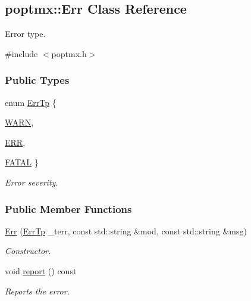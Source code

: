 \hypertarget{classpoptmx_1_1Err}{
\subsection{poptmx::Err Class Reference}
\label{classpoptmx_1_1Err}
}


Error type.  




{\ttfamily \#include $<$poptmx.h$>$}

\subsubsection*{Public Types}
\begin{DoxyCompactItemize}
\item 
enum \hyperlink{classpoptmx_1_1Err_a5536fbfa146a3c996c8d24282451d4aa}{ErrTp} \{ \par
\hyperlink{classpoptmx_1_1Err_a5536fbfa146a3c996c8d24282451d4aaade56e46c65dd44ee6d72a6421940f67d}{WARN}, 
\par
\hyperlink{classpoptmx_1_1Err_a5536fbfa146a3c996c8d24282451d4aaaed08113cd4b013e244fcede8e8737c43}{ERR}, 
\par
\hyperlink{classpoptmx_1_1Err_a5536fbfa146a3c996c8d24282451d4aaade501809751301eb7047c4be4ccbb9ff}{FATAL}
 \}
\begin{DoxyCompactList}\small\item\em Error severity. \item\end{DoxyCompactList}\end{DoxyCompactItemize}
\subsubsection*{Public Member Functions}
\begin{DoxyCompactItemize}
\item 
\hyperlink{classpoptmx_1_1Err_a66e9764ee0bb64be8bec08e7155a4ace}{Err} (\hyperlink{classpoptmx_1_1Err_a5536fbfa146a3c996c8d24282451d4aa}{ErrTp} \_\-terr, const std::string \&mod, const std::string \&msg)
\begin{DoxyCompactList}\small\item\em Constructor. \item\end{DoxyCompactList}\item 
void \hyperlink{classpoptmx_1_1Err_a95fb730166e6dafdd6f53900ac846952}{report} () const 
\begin{DoxyCompactList}\small\item\em Reports the error. \item\end{DoxyCompactList}\end{DoxyCompactItemize}
